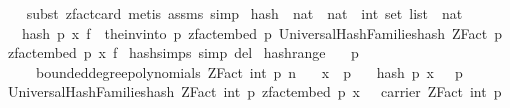 \begin{isabellebody}
\ \ \isamarkupfalse%
\ {\isacharparenleft}{\kern0pt}subst\ zfact{\isacharunderscore}{\kern0pt}card{\isacharcomma}{\kern0pt}\ metis\ assms{\isacharcomma}{\kern0pt}\ simp{\isacharparenright}{\kern0pt}%
\endisatagproof
{\isafoldproof}%
%
\isadelimproof
\isanewline
%
\endisadelimproof
\isanewline
{}\isamarkupfalse%
\ hash\ {\isacharcolon}{\kern0pt}{\isacharcolon}{\kern0pt}\ {\isachardoublequoteopen}nat\ {\isasymRightarrow}\ nat\ {\isasymRightarrow}\ int\ set\ list\ {\isasymRightarrow}\ nat{\isachardoublequoteclose}\isanewline
\ \ \ {\isachardoublequoteopen}hash\ p\ x\ f\ {\isacharequal}{\kern0pt}\ the{\isacharunderscore}{\kern0pt}inv{\isacharunderscore}{\kern0pt}into\ {\isacharbraceleft}{\kern0pt}{}{\isachardot}{\kern0pt}{\isachardot}{\kern0pt}{\isacharless}{\kern0pt}p{\isacharbraceright}{\kern0pt}\ {\isacharparenleft}{\kern0pt}zfact{\isacharunderscore}{\kern0pt}embed\ p{\isacharparenright}{\kern0pt}\ {\isacharparenleft}{\kern0pt}Universal{\isacharunderscore}{\kern0pt}Hash{\isacharunderscore}{\kern0pt}Families{\isachardot}{\kern0pt}hash\ {\isacharparenleft}{\kern0pt}ZFact\ p{\isacharparenright}{\kern0pt}\ {\isacharparenleft}{\kern0pt}zfact{\isacharunderscore}{\kern0pt}embed\ p\ x{\isacharparenright}{\kern0pt}\ f{\isacharparenright}{\kern0pt}{\isachardoublequoteclose}\isanewline
\isanewline
{}\isamarkupfalse%
\ hash{\isachardot}{\kern0pt}simps\ {\isacharbrackleft}{\kern0pt}simp\ del{\isacharbrackright}{\kern0pt}\isanewline
\isanewline
{}\isamarkupfalse%
\ hash{\isacharunderscore}{\kern0pt}range{\isacharcolon}{\kern0pt}\isanewline
\ \ \ {\isachardoublequoteopen}p\ {\isachargreater}{\kern0pt}\ {}{\isachardoublequoteclose}\isanewline
\ \ \ {\isachardoublequoteopen}{\isasymomega}\ {\isasymin}\ bounded{\isacharunderscore}{\kern0pt}degree{\isacharunderscore}{\kern0pt}polynomials\ {\isacharparenleft}{\kern0pt}ZFact\ {\isacharparenleft}{\kern0pt}int\ p{\isacharparenright}{\kern0pt}{\isacharparenright}{\kern0pt}\ n{\isachardoublequoteclose}\isanewline
\ \ \ {\isachardoublequoteopen}x\ {\isacharless}{\kern0pt}\ p{\isachardoublequoteclose}\isanewline
\ \ \ {\isachardoublequoteopen}hash\ p\ x\ {\isasymomega}\ {\isacharless}{\kern0pt}\ p{\isachardoublequoteclose}\isanewline
%
\isadelimproof
%
\endisadelimproof
%
\isatagproof
{}\isamarkupfalse%
\ {\isacharminus}{\kern0pt}\isanewline
\ \ \isamarkupfalse%
\ {\isachardoublequoteopen}Universal{\isacharunderscore}{\kern0pt}Hash{\isacharunderscore}{\kern0pt}Families{\isachardot}{\kern0pt}hash\ {\isacharparenleft}{\kern0pt}ZFact\ {\isacharparenleft}{\kern0pt}int\ p{\isacharparenright}{\kern0pt}{\isacharparenright}{\kern0pt}\ {\isacharparenleft}{\kern0pt}zfact{\isacharunderscore}{\kern0pt}embed\ p\ x{\isacharparenright}{\kern0pt}\ {\isasymomega}\ {\isasymin}\ carrier\ {\isacharparenleft}{\kern0pt}ZFact\ {\isacharparenleft}{\kern0pt}int\ p{\isacharparenright}{\kern0pt}{\isacharparenright}{\kern0pt}{\isachardoublequoteclose}\isanewline

\end{isabellebody}
